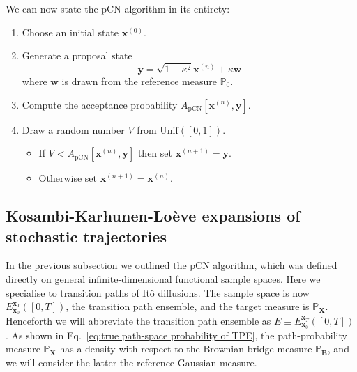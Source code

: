 
We can now state the pCN algorithm in its entirety:
\begin{enumerate}
\item Choose an initial state $\mathbf{x}^{(0)}$.

\item Generate a proposal state
	\begin{equation} \label{eq:pCN update rule}
		\mathbf{y} = \sqrt{1 - \kappa^2} \mathbf{x}^{(n)} + \kappa \mathbf{w}
	\end{equation}
	where $\mathbf{w}$ is drawn from the reference measure $\mathbb{P}_0$.
	
\item Compute the acceptance probability $A_\text{pCN}[\mathbf{x}^{(n)}, \mathbf{y}]$.
	
\item Draw a random number $V$ from $\text{Unif}([0,1])$.
	\begin{itemize}
		\item If $V < A_\text{pCN}[\mathbf{x}^{(n)}, \mathbf{y}]$ then set $\mathbf{x}^{(n+1)} = \mathbf{y}$.
		\item Otherwise set $\mathbf{x}^{(n+1)} = \mathbf{x}^{(n)}$.
	\end{itemize}
\end{enumerate}

\subsection{Kosambi-Karhunen-Lo\`eve expansions of stochastic trajectories} \label{sec:Kosambi-Karhunen-Loeve expansions of stochastic trajectories}
 
In the previous subsection we outlined the pCN algorithm, which was defined directly on general infinite-dimensional functional sample spaces. Here we specialise to transition paths of It\^{o} diffusions. The sample space is now $E_{\mathbf{x}_0}^{\mathbf{x}_T}([0,T])$, the transition path ensemble, and the target measure is $\mathbb{P}_\mathbf{X}$. Henceforth we will abbreviate the transition path ensemble as $E \equiv E_{\mathbf{x}_0}^{\mathbf{x}_T}([0,T])$. As shown in Eq.~\ref{eq:true path-space probability of TPE}, the path-probability measure $\mathbb{P}_\mathbf{X}$ has a density with respect to the Brownian bridge measure $\mathbb{P}_\mathbf{B}$, and we will consider the latter the reference Gaussian measure.

